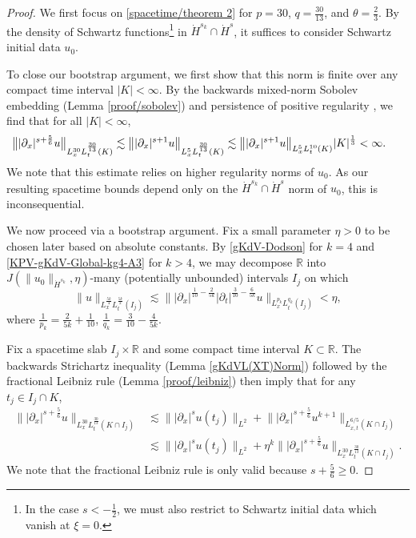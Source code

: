 \documentclass[10pt, reqno]{amsart}
\numberwithin{equation}{section}
\newcommand{\R}{\mathbb{R}}
\theoremstyle{definition}
\theoremstyle{remark}
\begin{document}
\begin{proof}
    We first focus on \eqref{spacetime/theorem 2} for $p = 30$, $q = \frac{30}{13}$, and $\theta = \frac{2}{3}$.
    By the density of Schwartz functions\footnote{In the case $s < -\frac{1}{2}$, we must also restrict to Schwartz initial data which vanish at $\xi = 0$.} in $\dot{H}^{s_k} \cap \dot{H}^s$, it suffices to consider Schwartz initial data $u_0$.
    
    To close our bootstrap argument, we first show that this norm is finite over any compact time interval $|K| < \infty$. By the backwards mixed-norm Sobolev embedding (Lemma \ref{proof/sobolev}) and persistence of positive regularity \cite{KPV93}, we find that for all $|K| < \infty$,
    \begin{align}\label{proof/finite}
        \hspace{-6pt}\big\||\partial_x|^{s + \frac{5}{6}}u \big\|_{L_x^{30}L_t^{\frac{30}{13}}(K)} & \lesssim \big\||\partial_x|^{s + 1} u\big\|_{L_x^5L_t^{\frac{30}{13}}(K)} \lesssim \big\||\partial_x|^{s + 1} u\big\|_{L_x^5L_t^{10}(K)}|K|^{\frac{1}{3}} < \infty.
    \end{align}
    We note that this estimate relies on higher regularity norms of $u_0$. As our resulting spacetime bounds depend only on the $\dot{H}^{s_k} \cap \dot{H}^s$ norm of $u_0$, this is inconsequential.

    We now proceed via a bootstrap argument. Fix a small parameter $\eta > 0$ to be chosen later based on absolute constants.
    By \eqref{gKdV-Dodson} for $k = 4$ and \eqref{KPV-gKdV-Global-kg4-A3} for $k > 4$, we may decompose $\R$ into $J(\|u_0\|_{\dot{H}^{s_k}},\eta)$-many (potentially unbounded) intervals $I_j$ on which
    \begin{equation*}
        \|u\|_{L_x^\frac{5k}{4} L_t^\frac{5k}{2}(I_j)} \lesssim \||\partial_x|^{\frac{1}{10}-\frac{2}{5k}}|\partial_t|^{\frac{3}{10}-\frac{6}{5k}}u\big\|_{L^{p_k}_{x}L^{q_k}_{t}(I_j)} < \eta,
    \end{equation*}
    where $\frac{1}{p_k}=\frac{2}{5k}+\frac{1}{10}$, $\frac{1}{q_k}=\frac{3}{10}-\frac{4}{5k}$.

    Fix a spacetime slab $I_j\times \R$ and some compact time interval $K \subset \R$. The backwards Strichartz inequality (Lemma \ref{gKdVL(XT)Norm}) followed by the fractional Leibniz rule (Lemma \ref{proof/leibniz}) then imply that for any $t_j \in I_j \cap K$,
    \begin{equation}\begin{split}\label{proof/1}
        \big\||\partial_x|^{s + \frac{5}{6}} u\big\|_{L_x^{30}L_t^{\frac{30}{13}}(K \cap I_j)}
        & \lesssim \big\| |\partial_x|^{s} u(t_j)\big\|_{L^2} + \big\| |\partial_x|^{s + \frac{5}{6}} u^{k+1}\big\|_{L_{x,t}^{6/5}(K \cap I_j)} \\
        & \lesssim \big\| |\partial_x|^s u(t_j)\big\|_{L^2} + \eta^k\big\||\partial_x|^{s + \frac{5}{6}}u \big\|_{L_x^{30} L_t^{\frac{30}{13}}(K \cap I_j)}.
    \end{split}\end{equation}
    We note that the fractional Leibniz rule is only valid because $s + \frac{5}{6} \geq 0$.


\end{proof}
\end{document}
